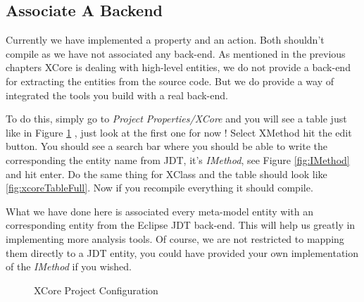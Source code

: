 \subsection{Associate A Backend}\label{subsection:backEnd}
        
        Currently we have implemented a property and an action. Both shouldn't compile as we have not associated any back-end.
As mentioned in the previous chapters XCore is dealing with high-level entities, we do not provide a back-end for extracting the entities from the source
code. But we do provide a way of integrated the tools you build with a real back-end. 
        
        To do this, simply go to \textit{Project Properties/XCore} and you will see a table just like in Figure \ref{fig:xcoreTable} , just look at the first one for now ! Select 
XMethod hit the edit button. You should see a search bar where you should be able to write the corresponding the entity name from JDT, it's \textit{IMethod}, see Figure \ref{fig:IMethod} and hit enter. Do the
same thing for XClass and the table should look like \ref{fig:xcoreTableFull}. Now if you recompile everything it should compile.

        What we have done here is associated every meta-model entity with an corresponding entity from the Eclipse JDT back-end. This will help us greatly in implementing more analysis tools. Of course, we 
are not restricted to mapping them directly to a JDT entity, you could have provided your own implementation of the \textit{IMethod} if you wished.

        \begin{figure}
             \centering
             \caption{XCore Project Configuration}
             \label{fig:xcoreTable}
        \end{figure}    

